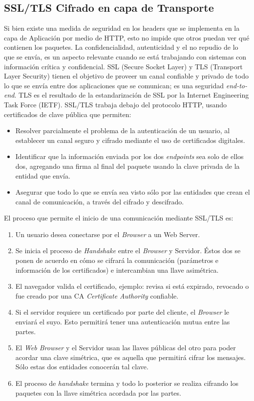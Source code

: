     \subsection{SSL/TLS Cifrado en capa de Transporte}
    Si bien existe una medida de seguridad en los headers que se implementa en la capa de Aplicación por medio de HTTP, esto no impide que otros puedan ver qué contienen los paquetes. La confidencialidad, autenticidad y el no repudio de lo que se envía, es un aspecto relevante cuando se está trabajando con sistemas con información crítica y confidencial. SSL (Secure Socket Layer) y TLS (Transport Layer Security) \cite{RFC-5246} tienen el objetivo de proveer un canal confiable y privado de todo lo que se envía entre dos aplicaciones que se comunican; es una seguridad \textit{end-to-end}. TLS es el resultado de la estandarización de SSL por la Internet Engineering Task Force (IETF). SSL/TLS trabaja debajo del protocolo HTTP, usando certificados de clave pública que permiten:
    \begin{itemize}
        \item Resolver parcialmente el problema de la autenticación de un usuario, al establecer un canal seguro y cifrado mediante el uso de certificados digitales.
        \item Identificar que la información enviada por los dos \textit{endpoints} sea solo de ellos dos, agregando una firma al final del paquete usando la clave privada de la entidad que envía.
        \item Asegurar que todo lo que se envía sea visto sólo por las entidades que crean el canal de comunicación, a través del cifrado y descifrado.
    \end{itemize}

    El proceso que permite el inicio de una comunicación mediante SSL/TLS es:
    \begin{enumerate}
        \item Un usuario desea conectarse por el \textit{Browser} a un Web Server.
        \item Se inicia el proceso de \textit{Handshake} entre el \textit{Browser} y Servidor. Éstos dos se ponen de acuerdo en cómo se cifrará la comunicación (parámetros e información de los certificados) e intercambian una llave asimétrica.
        \item El navegador valida el certificado, ejemplo: revisa si está expirado, revocado o fue creado por una CA \textit{Certificate Authority} confiable.
        \item Si el servidor requiere un certificado por parte del cliente, el \textit{Browser} le enviará el suyo. Esto permitirá tener una autenticación mutua entre las partes.
        \item El \textit{Web Browser} y el Servidor usan las llaves públicas del otro para poder acordar una clave simétrica, que es aquella que permitirá cifrar los mensajes. Sólo estas dos entidades conocerán tal clave.
        \item El proceso de \textit{handshake} termina y todo lo posterior se realiza cifrando los paquetes con la llave simétrica acordada por las partes.
    \end{enumerate}

